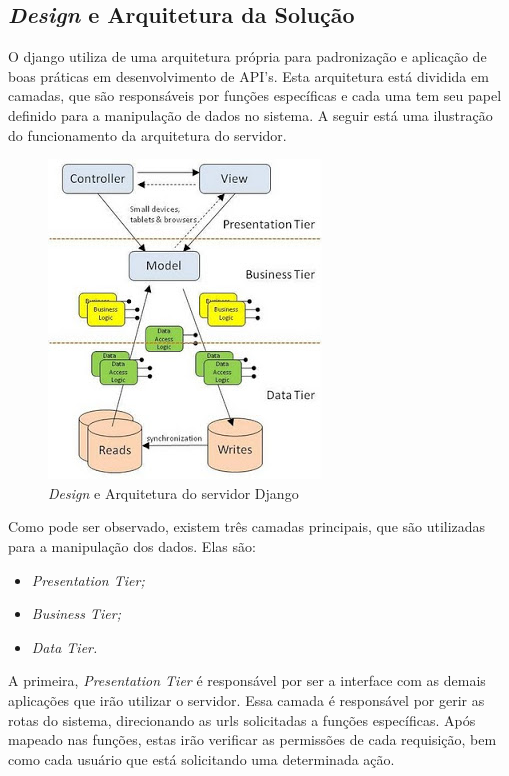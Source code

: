 \subsection{\textit{Design} e Arquitetura da Solução}
\label{sub:design_e_arquitetura_da_soluca_o}

O django utiliza de uma arquitetura própria para padronização e aplicação de boas
práticas em desenvolvimento de API's. Esta arquitetura está dividida em camadas,
que são responsáveis por funções específicas e cada uma tem seu papel definido
para a manipulação de dados no sistema. A seguir está uma ilustração do funcionamento
da arquitetura do servidor.

\begin{figure}
    \begin{center}
        \includegraphics[scale=1]{figuras/rest_arch.jpg}
    \end{center}
    \caption{\textit{Design} e Arquitetura do servidor Django \cite{serveruml}}
    \label{fig:rest_arch}
\end{figure}

Como pode ser observado, existem três camadas principais, que são utilizadas
para a manipulação dos dados. Elas são:

\begin{itemize}
    \item \textit{Presentation Tier;}
    \item \textit{Business Tier;}
    \item \textit{Data Tier.}
\end{itemize}

A primeira, \textit{Presentation Tier} é responsável por ser a interface com as demais aplicações
que irão utilizar o servidor. Essa camada é responsável por gerir as rotas do sistema, direcionando
as urls solicitadas a funções específicas. Após mapeado nas funções, estas irão verificar as permissões
de cada requisição, bem como cada usuário que está solicitando uma determinada ação.

